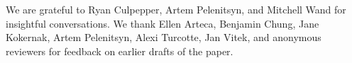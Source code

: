 \documentclass[sigplan]{acmart}\settopmatter{}
\begin{document}
\begin{acks}                            %
   
   We are grateful to Ryan Culpepper, Artem Pelenitsyn, and Mitchell Wand 
   for insightful conversations.
   We thank Ellen Arteca, Benjamin Chung, Jane Kokernak, Artem Pelenitsyn, 
   Alexi Turcotte, Jan Vitek, and anonymous reviewers 
   for feedback on earlier drafts of the paper.
\end{acks}

\newpage




\clearpage

\appendix


\end{document}
